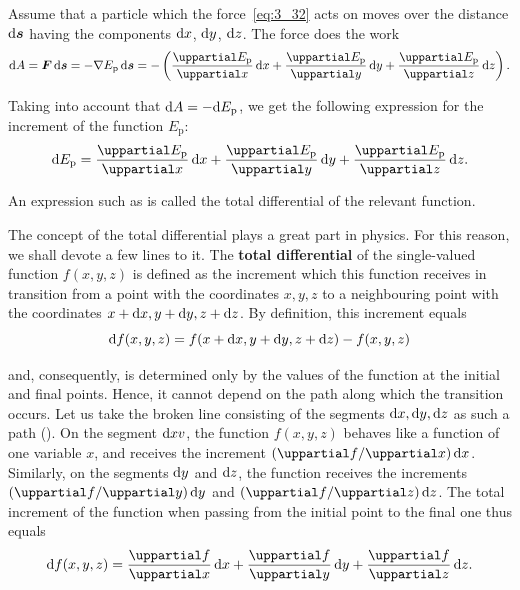 Assume that a particle which the force~\eqref{eq:3_32} acts on moves over the distance $\mathrm{d}\boldsymbol{s}$ having the components $\mathrm{d} x$, $\mathrm{d} y$, $\mathrm{d} z$. The force does the work
\begin{equation*}
\deriv{A} = \vec{F}\,\deriv{\vec{s}} = -\nabla E_{\text{p}}\,\deriv{\vec{s}} = - \left(\diffpartial{E_{\text{p}}}{x}\,\deriv{x} + \diffpartial{E_{\text{p}}}{y}\,\deriv{y} +  \diffpartial{E_{\text{p}}}{z}\,\deriv{z}\right).
\end{equation*}

\noindent
Taking into account that $\mathrm{d} A=-\mathrm{d} E_{\text{p}}$, we get the following expression for the increment of the function $E_{\text{p}}$:
\begin{equation}\label{eq:3_33}
\deriv{E_{\text{p}}} = \diffpartial{E_{\text{p}}}{x}\,\deriv{x} + \diffpartial{E_{\text{p}}}{y}\,\deriv{y} +  \diffpartial{E_{\text{p}}}{z}\,\deriv{z}.
\end{equation}

\noindent
An expression such as  is called the total differential of the relevant function.

The concept of the total differential plays a great part in physics. For this reason, we shall devote a few lines to it. The \textbf{total differential} of the single-valued function $f(x,y,z)$ is defined as the increment which this function receives in transition from a point with the coordinates $x,y,z$ to a neighbouring point with the coordinates $x+\mathrm{d} x, y+\mathrm{d} y, z+\mathrm{d} z$. By definition, this increment equals
\begin{equation*}
\mathrm{d} f(x,y,z) = f(x+\mathrm{d} x, y+\mathrm{d} y, z+\mathrm{d} z) - f(x,y,z)
\end{equation*}

\noindent
and, consequently, is determined only by the values of the function at the initial and final points. Hence, it cannot depend on the path along which the transition occurs. Let us take the broken line consisting of the segments $\mathrm{d} x, \mathrm{d} y, \mathrm{d} z$ as such a path (). On the segment $\mathrm{d} xv$, the function $f(x,y,z)$ behaves like a function of one variable $x$, and receives the increment $(\diffinpartial{f}{x})\,\deriv{x}$. Similarly, on the segments $\mathrm{d} y$ and $\mathrm{d} z$, the function receives the increments $(\diffinpartial{f}{y})\,\deriv{y}$ and $(\diffinpartial{f}{z})\,\deriv{z}$. The total increment of the function when passing from the initial point to the final one thus equals
\begin{equation}\label{eq:3_34}
\deriv{f}(x,y,z)  = \diffpartial{f}{x}\,\deriv{x} + \diffpartial{f}{y}\,\deriv{y} +  \diffpartial{f}{z}\,\deriv{z}.
\end{equation}

